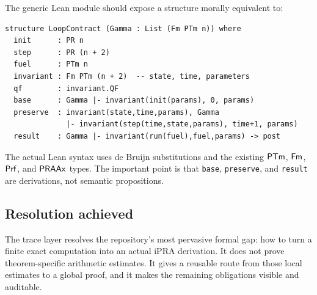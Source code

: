 The generic Lean module should expose a structure morally equivalent to:

\begin{lstlisting}[language={},caption={Source-level shape of a proof-producing loop contract}]
structure LoopContract (Gamma : List (Fm PTm n)) where
  init      : PR n
  step      : PR (n + 2)
  fuel      : PTm n
  invariant : Fm PTm (n + 2)  -- state, time, parameters
  qf        : invariant.QF
  base      : Gamma |- invariant(init(params), 0, params)
  preserve  : invariant(state,time,params), Gamma
              |- invariant(step(time,state,params), time+1, params)
  result    : Gamma |- invariant(run(fuel),fuel,params) -> post
\end{lstlisting}

The actual Lean syntax uses de Bruijn substitutions and the existing \(\mathsf{PTm}\), \(\mathsf{Fm}\), \(\mathsf{Prf}\), and \(\mathsf{PRAAx}\) types.  The important point is that \texttt{base}, \texttt{preserve}, and \texttt{result} are derivations, not semantic propositions.

\subsection{Resolution achieved}

The trace layer resolves the repository's most pervasive formal gap: how to turn a finite exact computation into an actual iPRA derivation.  It does not prove theorem-specific arithmetic estimates.  It gives a reusable route from those local estimates to a global proof, and it makes the remaining obligations visible and auditable.

